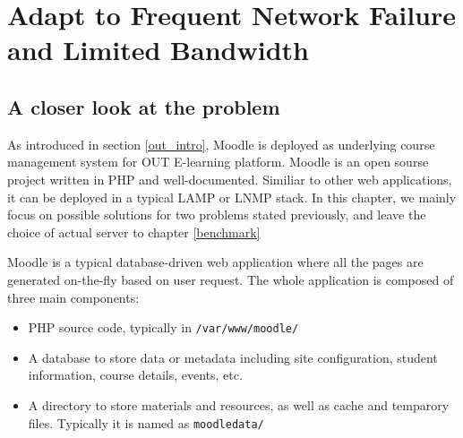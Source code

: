 \chapter{Adapt to Frequent Network Failure and Limited Bandwidth}\label{synch}




\section{A closer look at the problem} \label{components}
As introduced in section \ref{out_intro}, Moodle is deployed as underlying course management system for OUT E-learning platform. Moodle is an open sourse project written in PHP and well-documented\cite{aosamoodle}\cite{moodledoc}. Similiar to other web applications, it can be deployed in a typical LAMP or LNMP stack. In this chapter, we mainly focus on possible solutions for two problems stated previously, and leave the choice of actual server to chapter \ref{benchmark}

Moodle is a typical database-driven web application where all the pages are generated on-the-fly based on user request. The whole application is composed of three main components: 
\begin{itemize}
\item PHP source code, typically in \texttt{/var/www/moodle/}
\item A database to store data or metadata including site configuration, student information, course details, events, etc.
\item A directory to store materials and resources, as well as cache and temparory files. Typically it is named as \texttt{moodledata/}
\end{itemize}

